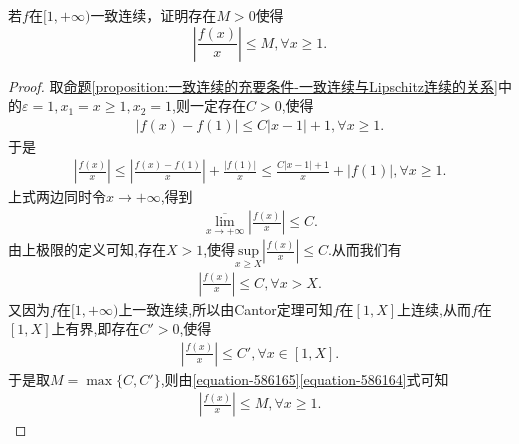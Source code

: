 \documentclass[../../main.tex]{subfiles}%
\begin{document}
\begin{corollary}[一致连续函数的阶的提升]\label{corollary:一致连续函数的阶的提升}
若\(f\)在\([1,+\infty)\)一致连续，证明存在\(M > 0\)使得
\[
\left|\frac{f(x)}{x}\right|\leqslant M,\forall x\geqslant1.
\]
\end{corollary}
\begin{proof}

取\hyperref[proposition:一致连续的充要条件-一致连续与Lipschitz连续的关系]{命题\ref{proposition:一致连续的充要条件-一致连续与Lipschitz连续的关系}}中的$\varepsilon=1,x_1=x\geqslant 1,x_2=1$,则一定存在$C>0$,使得
\begin{align*}
|f(x)-f\left( 1 \right) |\leqslant C|x-1|+1,\forall x\geqslant 1.
\end{align*}
于是
\begin{align*}
\left| \frac{f\left( x \right)}{x} \right|\leqslant \left| \frac{f\left( x \right) -f\left( 1 \right)}{x} \right|+\frac{\left| f\left( 1 \right) \right|}{x}\leqslant \frac{C\left| x-1 \right|+1}{x}+\left| f\left( 1 \right) \right|,\forall x\geqslant 1.
\end{align*}
上式两边同时令$x\to +\infty$,得到
\begin{align*}
\underset{x\rightarrow +\infty}{\overline{\lim }}\left| \frac{f\left( x \right)}{x} \right|\leqslant C.
\end{align*}
由上极限的定义可知,存在$X>1$,使得$\underset{x\geqslant X}{\mathrm{sup}}\left| \frac{f\left( x \right)}{x} \right|\leqslant C$.从而我们有
\begin{align}\label{equation-586165}
\left| \frac{f\left( x \right)}{x} \right|\leqslant C,\forall x>X.
\end{align}
又因为$f$在$[1,+\infty)$上一致连续,所以由Cantor定理可知$f$在$[1,X]$上连续,从而$f$在$[1,X]$上有界,即存在$C'>0$,使得
\begin{align}\label{equation-586164}
\left| \frac{f\left( x \right)}{x} \right|\leqslant C',\forall x\in [1,X].
\end{align}
于是取$M=\max\{C,C'\}$,则由\eqref{equation-586165}\eqref{equation-586164}式可知
\begin{align*}
\left|\frac{f(x)}{x}\right|\leqslant M,\forall x\geqslant1.
\end{align*}

\end{proof}
\end{document}
